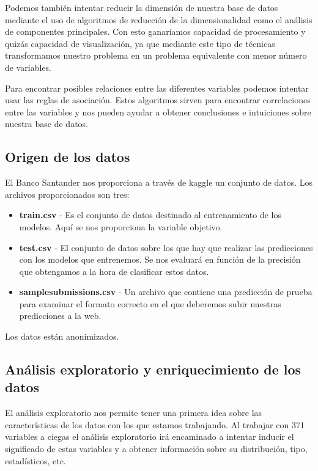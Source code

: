 \documentclass[11pt,a4paper,spanish]{article} %
\begin{document}
Podemos también intentar reducir la dimensión de nuestra base de datos mediante el uso de algoritmos de reducción de la dimensionalidad como el análisis de componentes principales. Con esto ganaríamos capacidad de procesamiento y quizás capacidad de visualización, ya que mediante este tipo de técnicas transformamos nuestro problema en un problema equivalente con menor número de variables. 

Para encontrar posibles relaciones entre las diferentes variables podemos intentar usar las reglas de asociación. Estos algoritmos sirven para encontrar correlaciones entre las variables y nos pueden ayudar a obtener conclusiones e intuiciones sobre nuestra base de datos. 

\subsection{Origen de los datos}

El Banco Santander nos proporciona a través de kaggle un conjunto de datos. Los archivos proporcionados son tres: 

\begin{itemize}

\item{\textbf{train.csv} - Es el conjunto de datos destinado al entrenamiento de los modelos. Aquí se nos proporciona la variable objetivo.}

\item{\textbf{test.csv} - El conjunto de datos sobre los que hay que realizar las predicciones con los modelos que entrenemos. Se nos evaluará en función de la precisión que obtengamos a la hora de clasificar estos datos.}

\item{\textbf{sample\textunderscore submissions.csv} - Un archivo que contiene una predicción de prueba para examinar el formato correcto en el que deberemos subir nuestras predicciones a la web.}

\end{itemize} 

Los datos están anonimizados. 

\subsection{Análisis exploratorio y enriquecimiento de los datos}
El análisis exploratorio nos permite tener una primera idea sobre las características de los datos con los que estamos trabajando. Al trabajar con 371 variables a ciegas el análisis exploratorio irá encaminado a intentar inducir el significado de estas variables y a obtener información sobre su distribución, tipo, estadísticos, etc.
\end{document}
